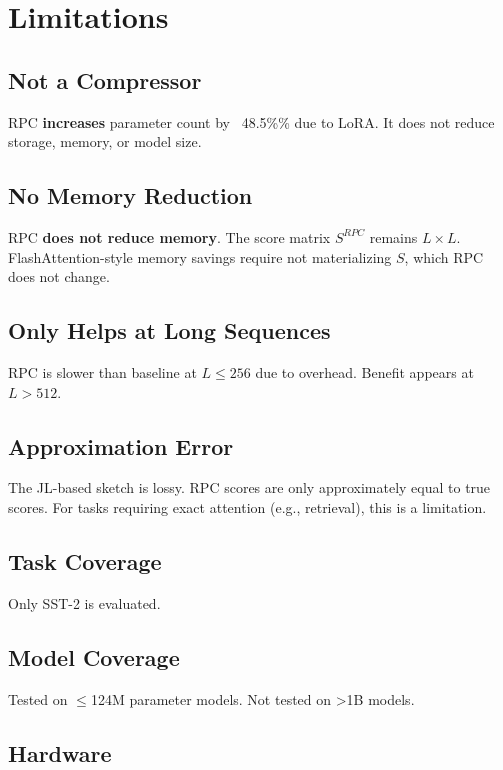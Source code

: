 
\section{Limitations}

\subsection{Not a Compressor}

RPC \textbf{increases} parameter count by ~48.5\%\% due to LoRA. It 
does not reduce storage, memory, or model size.

\subsection{No Memory Reduction}

RPC \textbf{does not reduce memory}. The score matrix $S^{RPC}$ remains $L \times L$. 
FlashAttention-style memory savings require not materializing $S$, which 
RPC does not change.

\subsection{Only Helps at Long Sequences}

RPC is slower than baseline at $L \leq 256$ due to overhead. Benefit appears 
at $L > 512$.

\subsection{Approximation Error}

The JL-based sketch is lossy. RPC scores are only approximately equal to 
true scores. For tasks requiring exact attention (e.g., retrieval), this 
is a limitation.

\subsection{Task Coverage}

Only SST-2 is evaluated.

\subsection{Model Coverage}

Tested on $\le$124M parameter models. Not tested on \textgreater{}1B models.

\subsection{Hardware}

